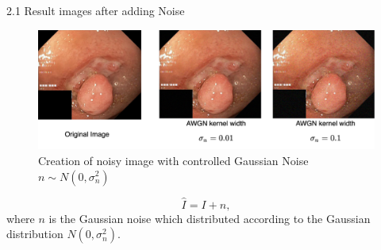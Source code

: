 \documentclass{libs/ufc_format}
\begin{document}
\begin{frame}{2.1 Result images after adding Noise}






    \begin{figure}
        \centering
        \includegraphics[width=1\textwidth]{libs/noisres.png}
        \caption{Creation of noisy image with controlled Gaussian Noise $n \sim N(0, \sigma^2_n)$}
        \label{noise_inpainted}
    \end{figure}
    \begin{equation}
        \hat{I}=I+n,
    \end{equation}
    where $n$ is the Gaussian noise which distributed according to the Gaussian distribution $N(0,\sigma^2_n)$.
\end{frame}
\end{document}
